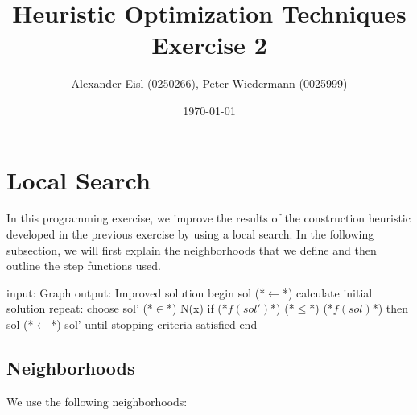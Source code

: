 \documentclass{scrartcl}
\author{Alexander Eisl (0250266), Peter Wiedermann (0025999)}
\date{\today}
\title{Heuristic Optimization Techniques \\ Exercise 2}
\begin{document}
\maketitle


\section{Local Search}
\label{sec:deterministic}
In this programming exercise, we improve the results of the
construction heuristic developed in the previous exercise by using a
local search. In the following subsection, we will first explain the
neighborhoods that we define and then outline the step functions used.

\begin{algorithm}[caption={Local search}]
    input: Graph 
    output: Improved solution
    begin
    	sol (*$\leftarrow$*) calculate initial solution
	repeat:
		choose sol' (*$\in$*) N(x) 
		if (*$f(sol')$*) (*$\leq$*) (*$f(sol)$*) then
			sol (*$\leftarrow$*) sol'
	until stopping criteria satisfied
    end
\end{algorithm}


\subsection{Neighborhoods}
\label{neighborhoods}
We use the following neighborhoods:
\end{document}
